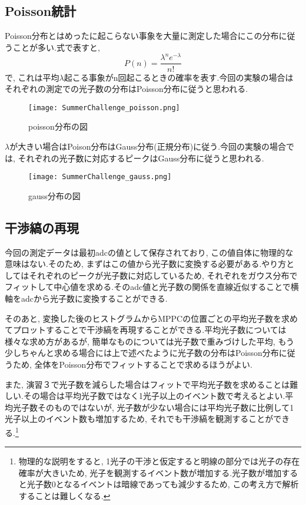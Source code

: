 \documentclass[uplatex,10pt,a4j]{jsarticle}
\begin{document}
\clearpage
\subsection{Poisson統計}
Poisson分布とはめったに起こらない事象を大量に測定した場合にこの分布に従うことが多い.式で表すと, 
\begin{equation}
  P\left(n\right)=\frac{\lambda^n e^{-\lambda}}{n!}
\end{equation}
で, これは平均$\lambda$起こる事象がn回起こるときの確率を表す.今回の実験の場合はそれぞれの測定での光子数の分布はPoisson分布に従うと思われる.
\begin{figure}[h]
  \begin{center}
    \texttt{[image: SummerChallenge\_poisson.png]}
    \caption{poisson分布の図}
    \label{fig:poisson}
  \end{center}
\end{figure}

$\lambda$が大きい場合はPoison分布はGauss分布(正規分布)に従う.今回の実験の場合では, それぞれの光子数に対応するピークはGauss分布に従うと思われる.
\begin{figure}[h]
  \begin{center}
    \texttt{[image: SummerChallenge\_gauss.png]}
    \caption{gauss分布の図}
    \label{fig:gauss}
  \end{center}
\end{figure}

\subsection{干渉縞の再現}
今回の測定データは最初adcの値として保存されており, この値自体に物理的な意味はない.そのため, まずはこの値から光子数に変換する必要がある.やり方としてはそれぞれのピークが光子数に対応しているため, それぞれをガウス分布でフィットして中心値を求める.そのadc値と光子数の関係を直線近似することで横軸をadcから光子数に変換することができる.

そのあと, 変換した後のヒストグラムからMPPCの位置ごとの平均光子数を求めてプロットすることで干渉縞を再現することができる.平均光子数については様々な求め方があるが, 簡単なものについては光子数で重みづけした平均, もう少しちゃんと求める場合には上で述べたように光子数の分布はPoisson分布に従うため, 全体をPoisson分布でフィットすることで求めるほうがよい.

また, 演習３で光子数を減らした場合はフィットで平均光子数を求めることは難しい.その場合は平均光子数ではなく1光子以上のイベント数で考えるとよい.平均光子数そのものではないが, 光子数が少ない場合には平均光子数に比例して1光子以上のイベント数も増加するため, それでも干渉縞を観測することができる.\footnote{物理的な説明をすると, 1光子の干渉と仮定すると明線の部分では光子の存在確率が大きいため, 光子を観測するイベント数が増加する.光子数が増加すると光子数0となるイベントは暗線であっても減少するため, この考え方で解析することは難しくなる.}
\end{document}
